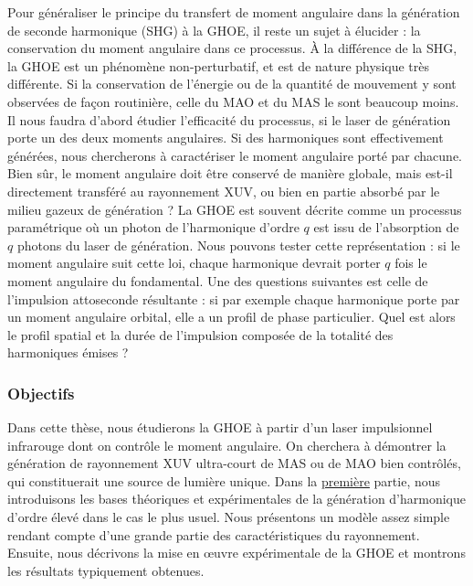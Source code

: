 Pour généraliser le principe du transfert de moment angulaire dans la génération de seconde harmonique (SHG) à la GHOE, il reste un sujet à élucider : la conservation du moment angulaire dans ce processus. \`A la différence de la SHG, la GHOE est un phénomène non-perturbatif, et est de nature physique très différente. Si la conservation de l'énergie ou de la quantité de mouvement y sont observées de façon routinière, celle du MAO et du MAS le sont beaucoup moins. Il nous faudra d'abord étudier l'efficacité du processus, si le laser de génération porte un des deux moments angulaires. Si des harmoniques sont effectivement générées, nous chercherons à caractériser le moment angulaire porté par chacune. Bien sûr, le moment angulaire doit être conservé de manière globale, mais est-il directement transféré au rayonnement XUV, ou bien en partie absorbé par le milieu gazeux de génération ? La GHOE est souvent décrite comme un processus paramétrique où un photon de l'harmonique d'ordre $q$ est issu de l'absorption de $q$ photons du laser de génération. Nous pouvons tester cette représentation : si le moment angulaire suit cette loi, chaque harmonique devrait porter $q$ fois le moment angulaire du fondamental. Une des questions suivantes est celle de l'impulsion attoseconde résultante : si par exemple chaque harmonique porte par un moment angulaire orbital, elle a un profil de phase particulier. Quel est alors le profil spatial et la durée de l'impulsion composée de la totalité des harmoniques émises ? 

\subsubsection{Objectifs}
Dans cette thèse, nous étudierons la GHOE à partir d'un laser impulsionnel infrarouge dont on contrôle le moment angulaire. On cherchera à démontrer la génération de rayonnement XUV ultra-court de MAS ou de MAO bien contrôlés, qui constituerait une source de lumière unique. Dans la \hyperref[PA:GHOE]{première} partie, nous introduisons les bases théoriques et expérimentales de la génération d'harmonique d'ordre élevé dans le cas le plus usuel. Nous présentons un modèle assez simple rendant compte d'une grande partie des caractéristiques du rayonnement. Ensuite, nous décrivons la mise en œuvre expérimentale de la GHOE et montrons les résultats typiquement obtenues.

